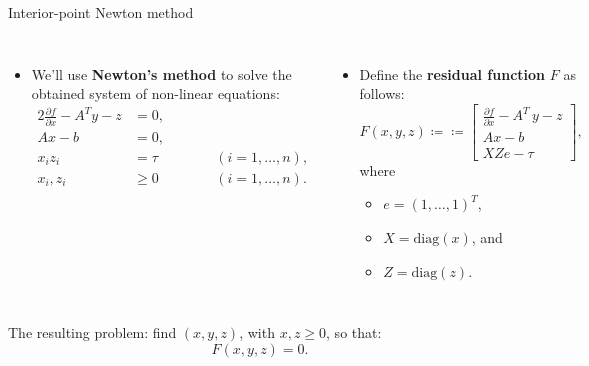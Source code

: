 %
%
\begin{frame}{Interior-point Newton method}
\begin{columns}[t]

\begin{itemize}
\item We'll use \alert{\bf Newton's method} to solve 
the obtained system of non-linear equations:
%
\begin{alignat*}{2}
\frac{\partial f}{\partial x} - A^{T}y-z & =0, & \qquad\\
Ax-b & =0,\\
x_{i}z_{i} & =\tau &  & (i=1,\ldots,n),\\
x_{i},z_{i} & \geq0 &  & (i=1,\ldots,n).
\end{alignat*}
%
\end{itemize}

\begin{itemize}
\item Define the \alert{\bf residual function} $F$ as follows:
\[
F(x,y,z)\coloneqq
\coloneqq\begin{bmatrix}
\frac{\partial f}{\partial x} - A^{T}\,y-z\\
Ax-b\\
XZe-\tau
\end{bmatrix}, 
\]
%
where 
\begin{itemize}
\item $e=(1,\ldots,1)^{T}$,
\item $X=\text{diag}(x)$, and 
\item $Z=\text{diag}(z)$.
\end{itemize}
\end{itemize}
\end{columns}
\vskip 10pt
\begin{tcolorbox}
	The resulting problem: find $(x,y,z)$, with $x,z\geq0$, so that: 
	\[
	F(x,y,z)=0.
	\]
\end{tcolorbox}

\end{frame}
